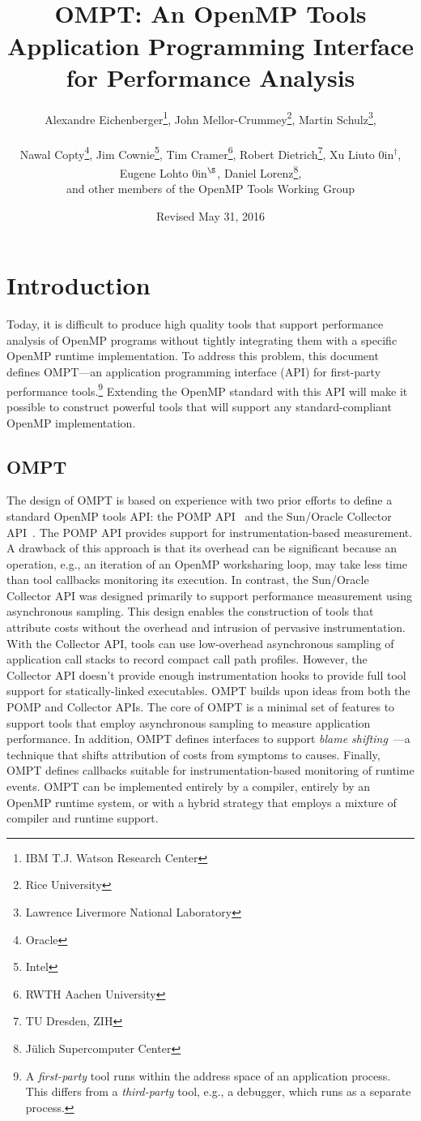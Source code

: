 \documentclass{article}
\title{OMPT: An OpenMP\textsuperscript{\textregistered} Tools Application Programming Interface for Performance Analysis}
\author{Alexandre Eichenberger\thanks{IBM T.J. Watson Research Center}, 
John Mellor-Crummey\thanks{Rice University}, 
Martin Schulz\thanks{Lawrence Livermore National Laboratory},
\\~\\
Nawal Copty\thanks{Oracle}, 
Jim Cownie\thanks{Intel},
Tim Cramer\thanks{RWTH Aachen University}, 
Robert Dietrich\thanks{TU Dresden, ZIH},
Xu Liu\hbox to 0in{$^\dagger$\hss},
Eugene Loh\hbox to 0in{$^\S$\hss}, 
Daniel Lorenz\thanks{J\"{u}lich Supercomputer Center}, 
\\
and other members of the OpenMP Tools Working Group}
\date{Revised May 31, 2016}
\begin{document}
  

                                           
\maketitle
\section{Introduction}
Today, it is difficult to produce high quality tools that support 
performance analysis of OpenMP programs without tightly integrating them with a specific OpenMP runtime implementation. To address this problem, this document defines OMPT---an application programming interface (API) for first-party performance tools.\footnote{A {\em first-party} tool runs within the address space of an application process. This differs from a {\em third-party} tool, e.g., a debugger, which runs as a separate process.}  
Extending the OpenMP standard with this API  will make it possible to construct powerful tools that will support any standard-compliant OpenMP implementation.

\subsection{OMPT}

The design of OMPT is based on experience with two prior efforts to define a standard OpenMP tools API: the POMP API~\cite{Mohr:EWOMP02} and the Sun/Oracle Collector API~\cite{SunCollector,Jost:2005:AND:1892830.1892858}. 
The POMP API provides support for instrumentation-based measurement. A drawback of this approach  is that its overhead can be significant because an operation, e.g., an iteration of an OpenMP worksharing loop, may take less time than tool callbacks monitoring its execution. 
In contrast, 
the Sun/Oracle Collector API was  designed primarily to support performance measurement 
using asynchronous sampling. This  design enables the construction of tools that attribute costs without the overhead and intrusion of pervasive instrumentation. With the Collector API, tools
 can use low-overhead asynchronous  sampling of application call stacks to record compact call path profiles. However, the Collector API doesn't provide enough instrumentation hooks to provide full tool support for statically-linked executables.
OMPT builds upon ideas from both the POMP and  Collector APIs. The core of OMPT is a minimal set of features to support tools that employ asynchronous sampling to measure application performance. In addition, OMPT defines  interfaces to support  {\em blame shifting}~\cite{Tallent:PPoPP09,Tallent:PPoPP10}---a technique that shifts attribution of costs from symptoms to causes.
Finally, OMPT defines callbacks suitable for instrumentation-based monitoring of runtime events. 
 OMPT can be implemented entirely by a compiler, entirely by an OpenMP runtime system, or with a hybrid strategy that employs a mixture of compiler and runtime support.
\end{document}
